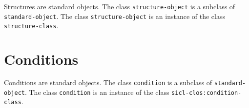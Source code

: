 Structures are standard objects.  The class \texttt{structure-object}
is a subclass of \texttt{standard-object}.  The class
\texttt{structure-object} is an instance of the class
\texttt{structure-class}.

\section{Conditions}

Conditions are standard objects.  The class \texttt{condition} is a
subclass of \texttt{standard-object}.  The class \texttt{condition} is
an instance of the class \texttt{sicl-clos:condition-class}.
